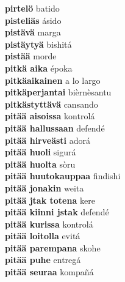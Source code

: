 \textbf{ pirtelö  } batido \\
\textbf{ pisteliäs  } ásido \\
\textbf{ pistävä  } marga \\
\textbf{ pistäytyä  } bishitá \\
\textbf{ pistää  } morde \\
\textbf{ pitkä aika  } époka \\
\textbf{ pitkäaikainen  } a lo largo \\
\textbf{ pitkäperjantai  } bièrnèsantu \\
\textbf{ pitkästyttävä  } cansando \\
\textbf{ pitää aisoissa  } kontrolá \\
\textbf{ pitää hallussaan  } defendé \\
\textbf{ pitää hirveästi  } adorá \\
\textbf{ pitää huoli  } sigurá \\
\textbf{ pitää huolta  } sòru \\
\textbf{ pitää huutokauppaa  } findishi \\
\textbf{ pitää jonakin  } weita \\
\textbf{ pitää jtak totena  } kere \\
\textbf{ pitää kiinni jstak  } defendé \\
\textbf{ pitää kurissa  } kontrolá \\
\textbf{ pitää loitolla  } evitá \\
\textbf{ pitää parempana  } skohe \\
\textbf{ pitää puhe  } entregá \\
\textbf{ pitää seuraa  } kompañá \\
